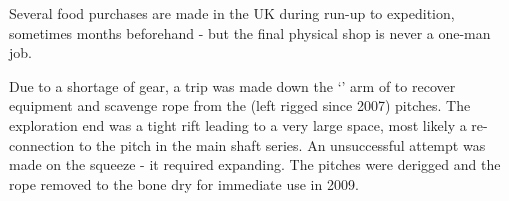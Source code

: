 \begin{marginfigure}
\checkoddpage \ifoddpage \forcerectofloat \else \forceversofloat \fi
\centering
 \caption{Several food purchases are made in the UK during run-up to expedition, sometimes months beforehand - but the final physical shop is never a one-man job. }
 \label{food}
\end{marginfigure}



Due to a shortage of gear, a trip was made down the `' arm of  to recover equipment and scavenge
rope from the (left rigged since 2007) pitches. The exploration end was
a tight rift leading to a very large space, most likely a re-connection
to the  pitch in the main  shaft
series. An unsuccessful attempt was made on the squeeze - it required
expanding. The pitches were derigged and the rope removed to the bone
dry  for immediate use in 2009.

